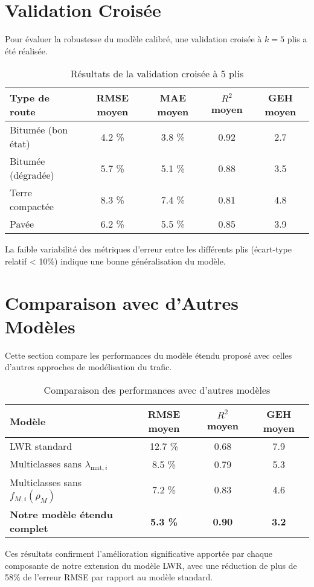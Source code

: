 \section{Validation Croisée}
\label{sec:validation_croisee}

Pour évaluer la robustesse du modèle calibré, une validation croisée à $k=5$ plis a été réalisée.

\begin{table}[htbp]
\centering
\caption{Résultats de la validation croisée à 5 plis}
\label{tab:validation_croisee}
\begin{tabular}{lcccc}
\toprule
\textbf{Type de route} & \textbf{RMSE moyen} & \textbf{MAE moyen} & \textbf{$R^2$ moyen} & \textbf{GEH moyen} \\
\midrule
Bitumée (bon état) & 4.2 \% & 3.8 \% & 0.92 & 2.7 \\
Bitumée (dégradée) & 5.7 \% & 5.1 \% & 0.88 & 3.5 \\
Terre compactée & 8.3 \% & 7.4 \% & 0.81 & 4.8 \\
Pavée & 6.2 \% & 5.5 \% & 0.85 & 3.9 \\
\bottomrule
\end{tabular}
\end{table}

La faible variabilité des métriques d'erreur entre les différents plis (écart-type relatif < 10\%) indique une bonne généralisation du modèle.

\section{Comparaison avec d'Autres Modèles}
\label{sec:comparaison_modeles}

Cette section compare les performances du modèle étendu proposé avec celles d'autres approches de modélisation du trafic.

\begin{table}[htbp]
\centering
\caption{Comparaison des performances avec d'autres modèles}
\label{tab:comparaison_modeles}
\begin{tabular}{lccc}
\toprule
\textbf{Modèle} & \textbf{RMSE moyen} & \textbf{$R^2$ moyen} & \textbf{GEH moyen} \\
\midrule
LWR standard & 12.7 \% & 0.68 & 7.9 \\
Multiclasses sans $\lambda_{\text{mat},i}$ & 8.5 \% & 0.79 & 5.3 \\
Multiclasses sans $f_{M,i}(\rho_M)$ & 7.2 \% & 0.83 & 4.6 \\
\textbf{Notre modèle étendu complet} & \textbf{5.3 \%} & \textbf{0.90} & \textbf{3.2} \\
\bottomrule
\end{tabular}
\end{table}

Ces résultats confirment l'amélioration significative apportée par chaque composante de notre extension du modèle LWR, avec une réduction de plus de 58\% de l'erreur RMSE par rapport au modèle standard.